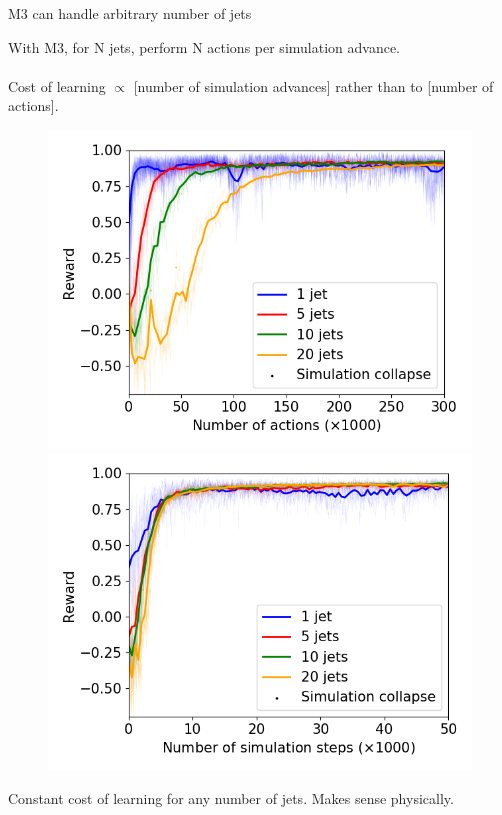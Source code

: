 \documentclass{beamer}
\begin{document}
\begin{frame}{M3 can handle arbitrary number of jets}

With M3, for N jets, perform N actions per simulation advance. \\~\\

Cost of learning $\propto$ [number of simulation advances] rather than to [number of actions]. 

\begin{figure}
    \begin{center}
      \includegraphics[width=.48\textwidth]{Figures/figure_comparison_njet_m31}
      \includegraphics[width=.48\textwidth]{Figures/figure_comparison_njet_m30}
    \end{center}
    \end{figure}
    
Constant cost of learning for any number of jets. Makes sense physically.    
\end{frame}
\end{document}

